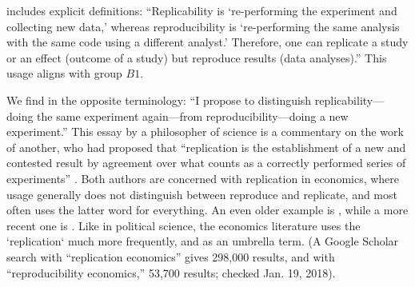 \documentclass{statement}
\newlength{\up}
\begin{document}
\cite{stevens2017} includes explicit definitions: ``Replicability is `re-performing the experiment and collecting new data,' whereas reproducibility is `re-performing the same analysis with the same code using a different analyst.' Therefore, one can replicate a study or an effect (outcome of a study) but reproduce results (data analyses).''
This usage aligns with group $B1$.

We find in \cite{cartwright1991} the opposite terminology:
``I propose to distinguish replicability---doing the same experiment again---from reproducibility---doing a new experiment.'' 
This essay by a philosopher of science is a commentary on the work of another, who had proposed that ``replication is the establishment of a new and contested result by agreement over what counts as a correctly performed series of experiments''  \cite[]{collins1991}. 
Both authors are concerned with replication in economics, where usage generally does not distinguish between reproduce and replicate, and most often uses the latter word for everything. 
An even older example is \cite{dewaldETal1986}, while a more recent one is \cite{mccullough2008}. 
Like in political science, the economics literature uses the `replication` much more frequently, and as an umbrella term. (A Google Scholar search with ``replication economics'' gives 298,000 results, and with ``reproducibility economics,'' 53,700 results; checked Jan. 19, 2018).













\end{document}
